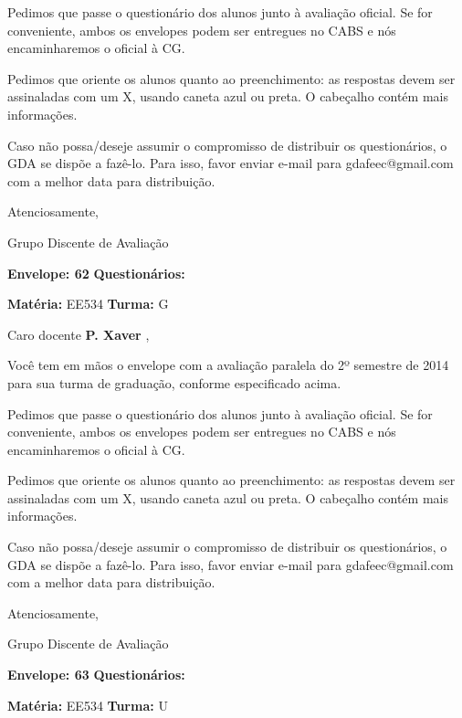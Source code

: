 \documentclass[a5paper]{letter}
\begin{document}
	Pedimos que passe o questionário dos alunos junto à avaliação oficial. Se for conveniente, ambos os envelopes podem ser entregues no CABS e nós encaminharemos o oficial à CG.

Pedimos que oriente os alunos quanto ao preenchimento: as respostas devem ser assinaladas com um X, usando caneta azul ou preta. O cabeçalho contém mais informações.

	Caso não possa/deseje assumir o compromisso de distribuir os questionários, o GDA se dispõe a fazê-lo. Para isso, favor enviar e-mail para gdafeec@gmail.com com a melhor data para distribuição.


Atenciosamente, 

Grupo Discente de Avaliação

\vspace{0.5cm}

{\bf Envelope: 62 }		\hfill	{\bf Questionários:} \hspace{2cm}

\newpage
\thispagestyle{empty}

\hfill {\bf Matéria:} EE534 {\bf Turma:} G

Caro docente {\bf P. Xaver }, 

	Você tem em mãos o envelope com a avaliação paralela do 2º semestre de 2014 para sua turma de graduação, conforme especificado acima.

	Pedimos que passe o questionário dos alunos junto à avaliação oficial. Se for conveniente, ambos os envelopes podem ser entregues no CABS e nós encaminharemos o oficial à CG.

Pedimos que oriente os alunos quanto ao preenchimento: as respostas devem ser assinaladas com um X, usando caneta azul ou preta. O cabeçalho contém mais informações.

	Caso não possa/deseje assumir o compromisso de distribuir os questionários, o GDA se dispõe a fazê-lo. Para isso, favor enviar e-mail para gdafeec@gmail.com com a melhor data para distribuição.


Atenciosamente, 

Grupo Discente de Avaliação

\vspace{0.5cm}

{\bf Envelope: 63 }		\hfill	{\bf Questionários:} \hspace{2cm}

\newpage
\thispagestyle{empty}

\hfill {\bf Matéria:} EE534 {\bf Turma:} U
\end{document}
